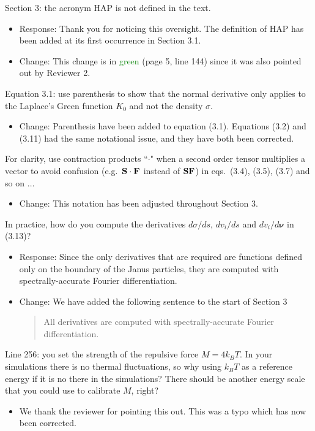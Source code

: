 \documentclass[11pt]{article}
\newcommand{\comment}[1]{{\color{blue} #1}}
\begin{document}
\noindent
\comment{Section 3: the acronym HAP is not defined in the text.}
\begin{itemize}
  \item Response: Thank you for noticing this oversight. The definition of HAP has
    been added at its first occurrence in Section 3.1. 
  \item Change: This change is in \textcolor{green}{green} (page 5, line 144) since it was also pointed
    out by Reviewer 2.
\end{itemize}

\noindent
\comment{Equation 3.1: use parenthesis to show that the normal
derivative only applies to the Laplace’s Green function $K_0$ and not
the density $\sigma$.}
\begin{itemize}
  \item Change: Parenthesis have been added to equation (3.1).  Equations (3.2) and (3.11) had the same notational issue, and
    they have both been corrected.
\end{itemize}

\noindent
\comment{For clarity, use contraction products ``$\cdot$" when a second
order tensor multiplies a vector to avoid confusion (e.g.~${\bf S} \cdot
{\bf F}$ instead of ${\bf SF}$) in eqs.~(3.4), (3.5), (3.7) and so on
$\ldots$}
\begin{itemize}
  \item Change: This notation has been adjusted throughout Section 3.
\end{itemize}

\noindent
\comment{In practice, how do you compute the derivatives $d\sigma /ds$,
$dv_i/ds$ and $dv_i/d\boldsymbol{\nu}$ in (3.13)?}
\begin{itemize}
  \item Response: Since the only derivatives that are required are functions
    defined only on the boundary of the Janus particles, they are
    computed with spectrally-accurate Fourier differentiation.

  \item Change: We have added the following sentence to the start of Section 3
    \begin{quotation}
      All derivatives are computed with spectrally-accurate Fourier
      differentiation.
    \end{quotation}
\end{itemize}

\noindent
\comment{Line 256: you set the strength of the repulsive force $M = 4k_B
T$. In your simulations there is no thermal fluctuations, so why using
$k_B T$ as a reference energy if it is no there in the simulations?
There should be another energy scale that you could use to calibrate
$M$, right?}
\begin{itemize}
\item We thank the reviewer for pointing this out.  This was a typo which has now been corrected. 
\end{itemize}
\end{document}
